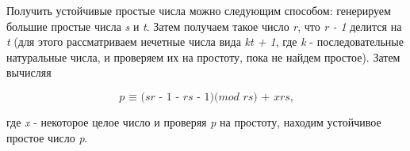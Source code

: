   Получить устойчивые простые числа можно следующим способом: генерируем большие простые числа \textit{s} и \textit{t}. Затем 
получаем такое число \textit{r}, что \textit{r - 1} делится на \textit{t} (для этого рассматриваем нечетные числа вида
\textit{kt + 1}, где \textit{k} - последовательные натуральные числа, и проверяем их на простоту, пока не найдем простое). 
Затем вычисляя 

  \begin{equation}
   \textit{p {$\equiv$} (sr - 1 - rs - 1)(mod rs) + xrs,}
  \end{equation}

где \textit{x} - некоторое целое число и проверяя \textit{p} на простоту, находим устойчивое простое число \textit{p}.
  

